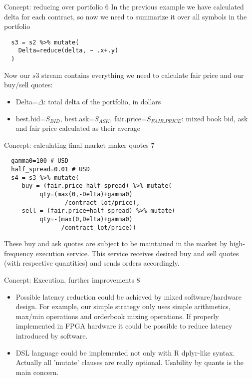 \documentclass[10pt]{beamer}
\begin{document}
\begin{frame}[fragile]{Concept: reducing over portfolio 6}
In the previous example we have calculated delta for each contract, so now we need to summarize it over all symbols in the portfolio
\begin{lstlisting}
  s3 = s2 %>% mutate(
    Delta=reduce(delta, ~ .x+.y)
  )
\end{lstlisting}
Now our $s3$ stream contains everything we need to calculate fair price and our buy/sell quotes:
\begin{itemize}
	\item Delta=$\Delta$: total delta of the portfolio, in dollars
	\item best.bid=$S_{BID}$, best.ask=$S_{ASK}$, fair.price=$S_{FAIR.PRICE}$: mixed book bid, ask and fair price calculated as their average
\end{itemize}
\end{frame}

\begin{frame}[fragile]{Concept: calculating final market maker quotes 7}
\begin{lstlisting}
  gamma0=100 # USD
  half_spread=0.01 # USD
  s4 = s3 %>% mutate(
     buy = (fair.price-half_spread) %>% mutate(
          qty=(max(0,-Delta)+gamma0)
                 /contract_lot/price),
     sell = (fair.price+half_spread) %>% mutate(
          qty=-(max(0,Delta)+gamma0)
                /contract_lot/price))
\end{lstlisting}
These buy and ask quotes are subject to be maintained in the market by high-frequency execution service. This service receives desired buy and sell quotes (with respective quantities) and sends orders accordingly.
\end{frame}

\begin{frame}{Concept: Execution, further improvements 8}
\begin{itemize}
\item Possible latency reduction could be achieved by mixed software/hardware design. For example, our simple strategy only uses simple arithmetics, max/min operations and orderbook mixing operations. If properly implemented in FPGA hardware it could be possible to reduce latency introduced by software.
\item DSL language could be implemented not only with R dplyr-like syntax. Actually all 'mutate' clauses are really optional. Usability by quants is the main concern.
\end{itemize}
\end{frame}
\end{document}
